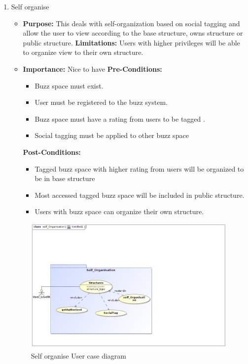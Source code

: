 \documentclass[11pt]{article}
\begin{document}
\begin{enumerate}
\item Self organise
\begin{itemize}
\item \textbf{Purpose:}
This deals with self-organization based on social tagging and
allow the user to view according to the base structure, owns structure
or public structure.
\newline
\textbf{Limitations:} 
Users with higher privileges will be able to
organize view to their own structure.

\item \textbf{Importance:}  Nice to have\newline
\textbf{Pre-Conditions: }
	\begin{itemize}
	\item Buzz space must exist.
	\item User must be registered to the buzz system.
	\item Buzz space must have a rating from users to be tagged .
	\item Social tagging must be applied to other buzz space
	\end{itemize}

\textbf{Post-Conditions: }
	\begin{itemize}
	\item Tagged buzz space with higher rating from users will be organized
to be in base structure
	\item Most accessed tagged buzz space will be included in public structure.
	\item Users with buzz space can organize their own structure.
	\end{itemize}
\end{itemize}
\begin{figure}[H]	
\graphicspath{ {../Diagrams/sfiso/} }
    	\includegraphics[scale=0.5]{self.jpg}
    	\caption{Self organise User case diagram}
	\end{figure}


\end{enumerate}
\end{document}
